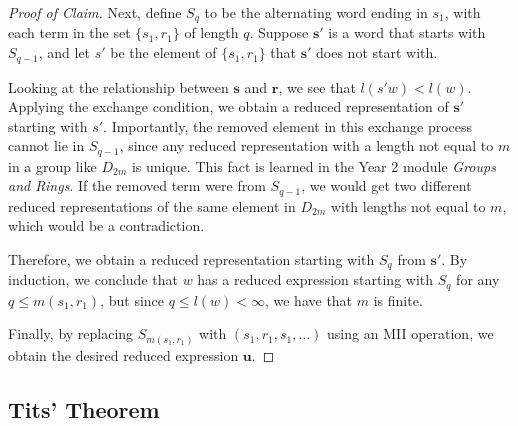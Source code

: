 \documentclass[../main.tex]{subfiles}
\begin{document}
\begin{lemma}
\begin{proof}[Proof of Claim]
        Next, define \( S_q \) to be the alternating word ending in \( s_1 \), with each term in the set \( \{ s_1, r_1 \} \) of length \( q \). Suppose \( \mathbf{s'} \) is a word that starts with \( S_{q-1} \), and let \( s' \) be the element of \( \{ s_1, r_1 \} \) that \( \mathbf{s'} \) does not start with.
    
        Looking at the relationship between \( \mathbf{s} \) and \( \mathbf{r} \), we see that \( l(s' w) < l(w) \). Applying the exchange condition, we obtain a reduced representation of \( \mathbf{s'} \) starting with \( s' \). Importantly, the removed element in this exchange process cannot lie in \( S_{q-1} \), since any reduced representation with a length not equal to \( m \) in a group like \( D_{2m} \) is unique. This fact is learned in the Year 2 module \textit{Groups and Rings}. If the removed term were from \( S_{q-1} \), we would get two different reduced representations of the same element in \( D_{2m} \) with lengths not equal to \( m \), which would be a contradiction.
    
        Therefore, we obtain a reduced representation starting with \( S_q \) from \( \mathbf{s'} \). By induction, we conclude that \( w \) has a reduced expression starting with \( S_q \) for any \( q \leq m(s_1, r_1) \), but since \( q \leq l(w) < \infty \), we have that \( m \) is finite.
    
        Finally, by replacing \( S_{m(s_1, r_1)} \) with \( (s_1, r_1, s_1, \dots) \) using an MII operation, we obtain the desired reduced expression \( \mathbf{u} \).
    \end{proof}
\end{lemma}

\subsection{Tits' Theorem}
\end{document}
